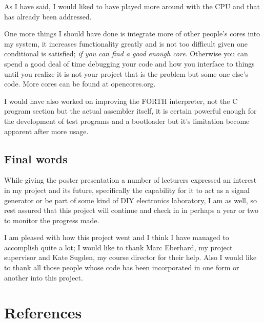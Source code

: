 \documentclass	[a4paper, 10pt]	{article}
\begin{document}
    As I have said, I would liked to have played more around with the CPU and that has
    already been addressed.

    One more things I should have done is integrate more of other people's cores into
    my system, it increases functionality greatly and is not too difficult given one
    conditional is satisfied; \emph{if you can find a good enough core}. Otherwise you
    can spend a good deal of time debugging your code and how you interface to things
    until you realize it is not your project that is the problem but some one else's
    code. More cores can be found at opencores.org\cite{opencore}.

    I would have also worked on improving the FORTH interpreter, not the C program
    section but the actual assembler itself, it is certain powerful enough for the
    development of test programs and a bootloader but it's limitation become apparent
    after more usage.

    \subsection{Final words}

    While giving the poster presentation a number of lecturers expressed an interest
    in my project and its future, specifically the capability for it to act as a
    signal generator or be part of some kind of DIY electronics laboratory, I am as well,
    so rest assured that this project will continue and check in in perhaps a year or 
    two to monitor the progress made.

    I am pleased with how this project went and I think I have managed to accomplish
    quite a lot; I would like to thank Marc Eberhard, my project supervisor and Kate
    Sugden, my course director for their help. Also I would like to thank all those
    people whose code has been incorporated in one form or another into this project.

  \section{References}
\end{document}
